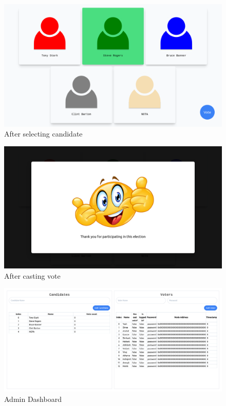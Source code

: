 \documentclass[oneside, 12pt]{book}
\begin{document}
\begin{figure}[H]
	\includegraphics[width=\linewidth]{./Resources/post-vote.png}
	\caption{After selecting candidate}
	\label{fig:post-vote}
\end{figure}
\begin{figure}[H]
	\includegraphics[width=\linewidth]{./Resources/thankyou.png}
	\caption{After casting vote}
	\label{fig:thankyou}
\end{figure}
\begin{figure}[H]
	\includegraphics[width=\linewidth]{./Resources/admin.png}
	\caption{Admin Dashboard}
	\label{fig:admin}
\end{figure}
\newpage
\end{document}
